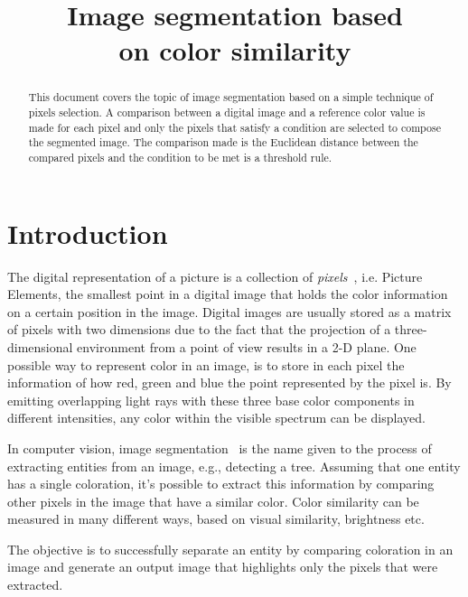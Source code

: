 \documentclass{bmvc2k}
\title{Image segmentation based\\ on color similarity}
\begin{document}
\maketitle

\begin{abstract}
This document covers the topic of image segmentation based on a simple technique of pixels selection. A comparison between a digital image and a reference color value is made for each pixel and only the pixels that satisfy a condition are selected to compose the segmented image. The comparison made is the Euclidean distance between the compared pixels and the condition to be met is a threshold rule.
\end{abstract}

\section{Introduction}
\label{sec:intro}

The digital representation of a picture is a collection of \textit{pixels}~\cite{wiki-pixel}, i.e. Picture Elements, the smallest point in a digital image that holds the color information on a certain position in the image. Digital images are usually stored as a matrix of pixels with two dimensions due to the fact that the projection of a three-dimensional environment from a point of view results in a 2-D plane. One possible way to represent color in an image, is to store in each pixel the information of how red, green and blue the point represented by the pixel is. By emitting overlapping light rays with these three base color components in different intensities, any color within the visible spectrum can be displayed.

In computer vision, image segmentation~\cite{wiki-image-segmentation} is the name given to the process of extracting entities from an image, e.g., detecting a tree. Assuming that one entity has a single coloration, it's possible to extract this information by comparing other pixels in the image that have a similar color. Color similarity can be measured in many different ways, based on visual similarity, brightness etc.

The objective is to successfully separate an entity by comparing coloration in an image and generate an output image that highlights only the pixels that were extracted.

\end{document}
